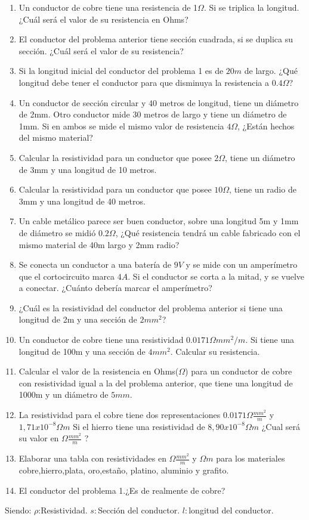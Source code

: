 \documentclass[14pt,a4paper]{article}
\begin{document}
\begin{enumerate}
\large    
    \item Un conductor de cobre tiene una resistencia de 1$\Omega$. Si se triplica la longitud. ¿Cuál será el valor de su resistencia en Ohms?
    \item El conductor del problema anterior tiene sección cuadrada, si se duplica su sección. ¿Cuál será el valor de su resistencia?
    \item Si la longitud inicial del conductor del problema 1 es de $20m$ de largo. ¿Qué longitud debe tener el conductor para que disminuya la resistencia a $0.4\Omega$?
    \item Un conductor de sección circular y 40 metros de longitud, tiene un diámetro de 2mm. Otro conductor mide 30 metros de largo y tiene un diámetro de 1mm. Si en ambos se mide el mismo valor de resistencia $4\Omega$, ¿Están hechos del mismo material?   
    \item Calcular la resistividad para un conductor que posee $2\Omega$, tiene un diámetro de 3mm y una longitud de 10 metros.
    \item Calcular la resistividad para un conductor que posee $10\Omega$, tiene un radio de 3mm y una longitud de 40 metros.
    \item Un cable metálico parece ser buen conductor, sobre una longitud 5m y 1mm de diámetro se midió $0.2\Omega$, ¿Qué resistencia tendrá un cable fabricado con el mismo material de 40m largo y 2mm radio?
    \item Se conecta un conductor a una batería de $9V$ y se mide con un amperímetro que el cortocircuito marca $4A$. Si el conductor se corta a la mitad, y se vuelve a conectar. ¿Cuánto debería marcar el amperímetro?
    \item ¿Cuál es la resistividad del conductor del problema anterior si tiene una longitud de 2m y una sección de $2mm^2$?
    \item Un conductor de cobre tiene una resistividad $0.0171 \Omega mm^2/m$. Si tiene una longitud de 100m y una sección de $4mm^2$. Calcular su resistencia.
    \item Calcular el valor de la resistencia en Ohms($\Omega$) para un conductor de cobre con resistividad igual a la del problema anterior, que tiene una longitud de 1000m y un diámetro de $5mm$.
    \item La resistividad para el cobre tiene dos representaciones $0.0171 \Omega \frac{mm^2}{m}$ y $1,71 x 10^{-8}\Omega m$ Si el hierro tiene una resistividad de $8,90 x 10^{-8}\Omega m$ ¿Cual será su valor en $\Omega \frac{mm^2}{m}$ ?
    \item Elaborar una tabla con resistividades en $\Omega \frac{mm^2}{m}$ y $\Omega m$ para los materiales cobre,hierro,plata, oro,estaño, platino, aluminio y grafito.
    \item El conductor del problema 1.¿Es de realmente de cobre?
\end{enumerate}

Siendo:
$\rho$:Resistividad.
$s:$Sección del conductor.
$l:$longitud del conductor.

\centering
{}
\end{document}
